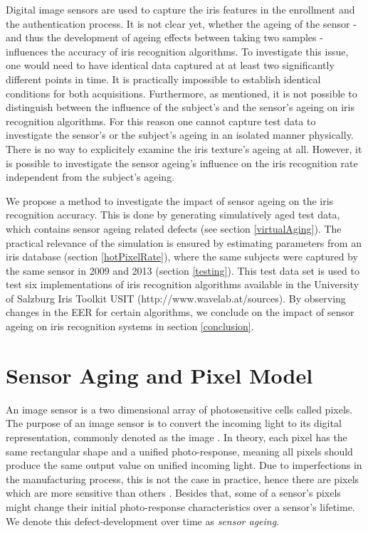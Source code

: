 \documentclass[10pt,twocolumn,letterpaper]{article}
\begin{document}
Digital image sensors are used to capture the iris features in the enrollment and the authentication process. It is not clear yet, whether the ageing of the sensor - and thus the development of ageing effects between taking two samples - influences the accuracy of iris recognition algorithms. To investigate this issue, one would need to have identical data captured at at least two significantly different points in time. It is practically impossible to establish identical conditions for both acquisitions. Furthermore, as mentioned, it is not possible to distinguish between the influence of the subject's and the sensor's ageing on iris recognition algorithms. For this reason one cannot capture test data to investigate the sensor's or the subject's ageing in an isolated manner physically. There is no way to explicitely examine the iris texture's ageing at all. However, it is possible to investigate the sensor ageing's influence on the iris recognition rate independent from the subject's ageing.

We propose a method to investigate the impact of sensor ageing on the iris recognition accuracy. This is done by generating simulatively aged test data, which contains sensor ageing related defects
(see section \ref{virtualAging}). The practical relevance of the simulation is ensured by estimating parameters from an iris database (section \ref{hotPixelRate}), where the same subjects were captured by the same sensor in 2009 and 2013 (section \ref{testing}). This test data set is used to test six implementations of iris recognition algorithms available in the University of Salzburg Iris Toolkit USIT (http://www.wavelab.at/sources). By observing changes in the EER for certain algorithms, we conclude on the impact of sensor ageing on iris recognition systems in section \ref{conclusion}.


\section{Sensor Aging and Pixel Model}
\label{sec:ageingAndPixelModel}
An image sensor is a two dimensional array of photosensitive cells called pixels. The purpose of an image sensor is to convert the incoming light to its digital representation, commonly denoted as the image \cite{imageSensors}. In theory, each pixel has the same rectangular shape and a unified photo-response, meaning all pixels should produce the same output value on unified incoming light. Due to imperfections in the manufacturing process, this is not the case in practice, hence there are pixels which are more sensitive than others \cite{camAndDisplays}. Besides that, some of a sensor's pixels might change their initial photo-response characteristics over a sensor's lifetime. We denote this defect-development over time as \emph{sensor ageing}.
\end{document}
